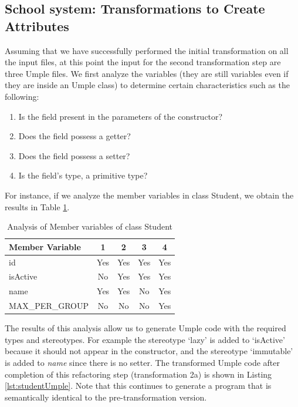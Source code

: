 \subsection{School system: Transformations to Create Attributes}

Assuming that we have successfully performed the initial transformation on all the input files, at this point the input for the second transformation step are three Umple files.
We first analyze the variables (they are still variables even if they are inside an Umple class) to determine certain characteristics such as the following:

\begin{enumerate}
\item Is the field present in the parameters of the constructor?
\item Does the field possess a getter?
\item Does the field possess a setter?
\item Is the field's type, a primitive type?
\end{enumerate}

For instance, if we analyze the member variables in class Student, we obtain the results in Table \ref{table:analysisStudent}.

\begin{table}[ht]
\caption{Analysis of Member variables of class Student}
\label{table:analysisStudent}
\centering
\begin{tabular}{l|cccc}
\toprule
\rowcolor[HTML]{BBDAFF}
\textbf{Member Variable} & \textbf{1}  & \textbf{2}   & \textbf{3}   & \textbf{4}    \\ \hline
id & Yes &  Yes &  Yes &  Yes \\ 
isActive &  No &  Yes &  Yes &  Yes \\ 
name &  Yes &  Yes &  No &  Yes \\ 
MAX\_PER\_GROUP &  No &  No &  No &  Yes \\ 
\hline
\end{tabular}
\end{table}

The results of this analysis allow us to generate Umple code with the required types and stereotypes. For example the stereotype `lazy' is added to `isActive' because it should not appear in the constructor, and the stereotype `immutable' is added to \textit{name} since there is no setter. The transformed Umple code after completion of this refactoring step (transformation 2a) is shown in Listing \ref{lst:studentUmple}. Note that this continues to generate a program that is semantically identical to the pre-transformation version.

